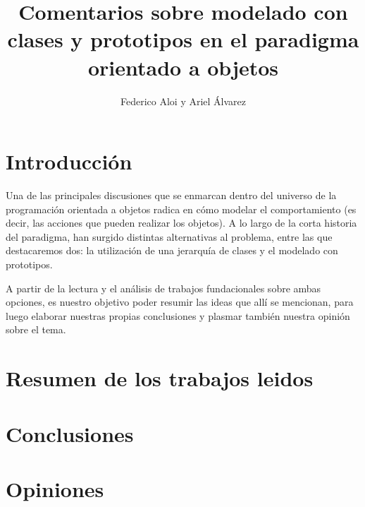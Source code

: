 \documentclass[a4paper,10pt]{article}
\title{Comentarios sobre modelado con clases y prototipos en el paradigma orientado a objetos}
\author{Federico Aloi y Ariel Álvarez}
\begin{document}
\maketitle

\section{Introducción}
Una de las principales discusiones\cite{Treaty} que se enmarcan dentro del universo de la programación orientada a objetos radica en cómo modelar el comportamiento (es decir, las acciones que pueden realizar los objetos). A lo largo de la corta historia del paradigma, han surgido distintas alternativas al problema, entre las que destacaremos dos: la utilización de una jerarquía de clases y el modelado con prototipos.

A partir de la lectura y el análisis de trabajos fundacionales sobre ambas opciones, es nuestro objetivo poder resumir las ideas que allí se mencionan, para luego elaborar nuestras propias conclusiones y plasmar también nuestra opinión sobre el tema.

\section{Resumen de los trabajos leidos}

\section{Conclusiones}

\section{Opiniones}

\printbibliography
\end{document}

